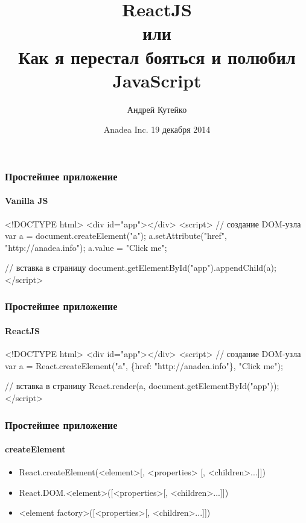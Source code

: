 \documentclass[10pt,utf8]{beamer}
\title{ReactJS\\ или\\ Как я перестал бояться и полюбил JavaScript}
\date{Anadea Inc. 19 декабря 2014}
\author{Андрей Кутейко}
\begin{document}
\begin{frame}
  \titlepage
\end{frame}

\begin{frame}[fragile]
  \frametitle{Простейшее приложение}
  \framesubtitle{Vanilla JS}

  \begin{semiverbatim}
    <!DOCTYPE html>
    <div id="app"\phantom{}></div>
    <script>
    // создание DOM-узла
    var a = document.createElement("a");
    a.setAttribute("href"\phantom{}, "http://anadea.info");
    a.value = "Click me";

    // вставка в страницу
    document.getElementById("app").appendChild(a);
    </script>
  \end{semiverbatim}
\end{frame}

\begin{frame}[fragile]
  \frametitle{Простейшее приложение}
  \framesubtitle{ReactJS}

  \begin{semiverbatim}
    <!DOCTYPE html>
    <div id="app"\phantom{}></div>
    <script>
    // создание DOM-узла
    var a = React.createElement("a"\phantom{},
      \{href: "http://anadea.info"\},
      "Click me");

    // вставка в страницу
    React.render(a, document.getElementById("app"));
    </script>
  \end{semiverbatim}
\end{frame}

\begin{frame}[fragile]
  \frametitle{Простейшее приложение}
  \framesubtitle{createElement}

  \begin{itemize}
  \item
    \begin{semiverbatim}
React.createElement(\alert{<element>}[, \alert{<properties>}
  [, \alert{<children>...}]])
    \end{semiverbatim}
    \pause

  \item
    \begin{semiverbatim}
React.DOM.\alert{<element>}([\alert{<properties>}[, \alert{<children>...}]])
    \end{semiverbatim}
    \pause

  \item
    \begin{semiverbatim}
\alert{<element factory>}([\alert{<properties>}[, \alert{<children>...}]])
    \end{semiverbatim}
  \end{itemize}
\end{frame}
\end{document}
